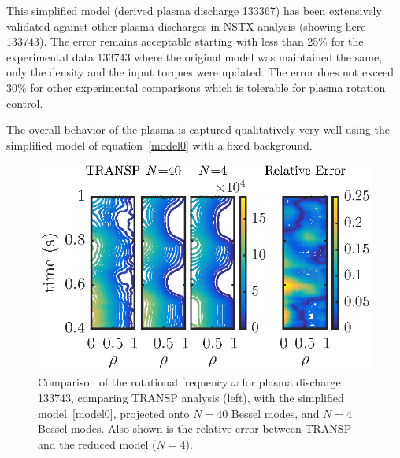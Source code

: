 \documentclass{iopart}
\begin{document}
This simplified model (derived plasma discharge 133367) has been extensively validated against other plasma discharges in NSTX analysis (showing here 133743). The error remains acceptable starting with less than 25\% for the  experimental data 133743 where the original model was maintained the same, only the density and the input torques were updated. The error does not exceed 30\% for other experimental comparisons which is tolerable for plasma rotation control.

The overall behavior of the plasma is captured qualitatively very well using the simplified model of equation~\eqref{model0} with a fixed background. 

\begin{figure}
\includegraphics{fig9}
\caption{Comparison of the rotational frequency $\omega$ for plasma discharge 133743, comparing TRANSP analysis (left), with the simplified model~\eqref{model0}, projected onto $N=40$ Bessel modes, and $N=4$ Bessel modes.  Also shown is the relative error between TRANSP and the reduced model ($N=4$).}
\label{fig10}
\end{figure}
\end{document}
